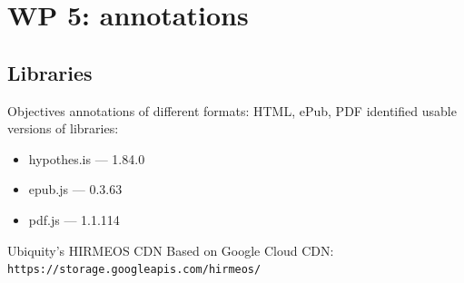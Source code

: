 \documentclass[xcolor=svgnames]{beamer}
\begin{document}

\section{WP 5: annotations}

    \subsection{Libraries}

        \begin{frame}{Objectives}
            annotations of different formats: HTML, ePub, PDF
            identified usable versions of libraries:
            \begin{itemize}
                \item hypothes.is --- 1.84.0
                \item epub.js --- 0.3.63
                \item pdf.js --- 1.1.114
            \end{itemize}
            \pause
            \begin{block}{Ubiquity's HIRMEOS CDN}
                Based on Google Cloud CDN: \texttt{https://storage.googleapis.com/hirmeos/}
            \end{block}
        \end{frame}
\end{document}
